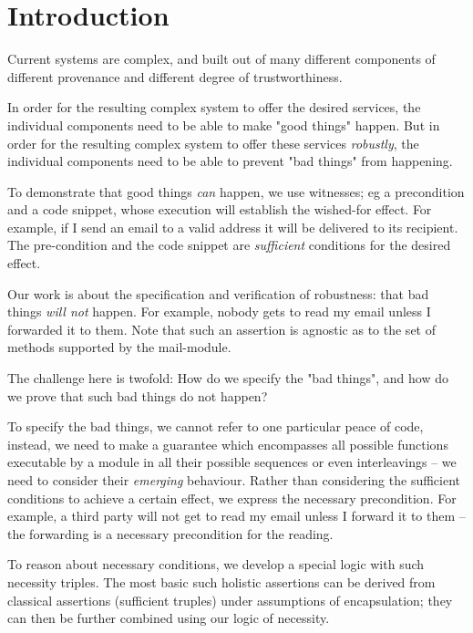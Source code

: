 \section{Introduction}

Current systems are complex, and  built out of many different components of different provenance and
different degree of trustworthiness.
  
  \newcommand{\prg}[1]{{\texttt{#1}}}
  
In order for the resulting  complex system to offer the
desired services, the individual components 
need to   be able to make "good things"   happen.
But in order for the resulting  complex system
 to offer these services \emph{robustly},  the individual components 
 need to be able to prevent "bad things" from happening. 

  To demonstrate that   good things \emph{can} happen, we use  witnesses;
eg  a precondition and a code snippet, whose execution will establish the
wished-for effect.  For example, if I send an email to a valid address it will
be delivered to its recipient. The pre-condition and the code snippet
are \emph{sufficient} conditions for the desired effect. 

Our work is about the specification and verification of robustness: that bad things \emph{will 
not} happen. For example, nobody gets to read my email unless I forwarded it to them.   
Note that such an assertion is agnostic as to the set of methods supported by the mail-module.

The challenge here is twofold: How do we specify the "bad things",
 and how do we prove that such bad things do not happen? 

To specify the bad things, we cannot
refer to one particular peace of code, %
 instead, we need to make a guarantee which encompasses all possible
 functions executable by a module in all their possible sequences or even interleavings --
 we need to consider their \emph{emerging} behaviour.
 Rather than considering the sufficient conditions to achieve a certain effect,
 we express the necessary precondition. For example,    a third party 
 will not get to read my email unless I forward it to them -- the forwarding
 is a necessary precondition for the reading.
 
 To reason about necessary conditions, we develop a special
 logic with such necessity triples. The most basic such holistic assertions 
 can be derived from classical assertions (sufficient truples)
 under assumptions of encapsulation;
 they can then be further combined using our logic of necessity.
 
